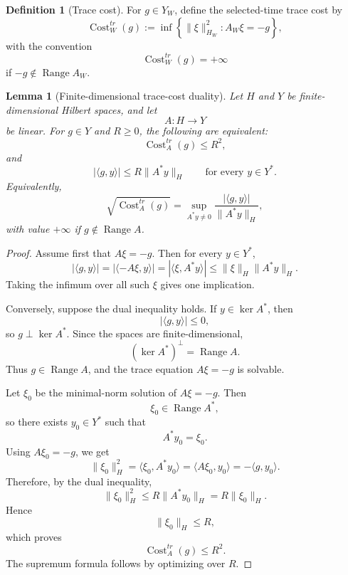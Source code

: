 \documentclass[11pt]{article}
\numberwithin{equation}{section}
\theoremstyle{plain}
\newtheorem{lemma}[theorem]{Lemma}
\theoremstyle{definition}
\newtheorem{definition}[theorem]{Definition}
\theoremstyle{remark}
\begin{document}
\begin{definition}[Trace cost]
\label{def:trace-cost}
For \(g\in Y_W\), define the selected-time trace cost by
\[
        \operatorname{Cost}^{tr}_W(g)
        :=
        \inf
        \left\{
            \|\xi\|_{H_W}^2:
            A_W\xi=-g
        \right\},
\]
with the convention
\[
        \operatorname{Cost}^{tr}_W(g)=+\infty
\]
if \(-g\notin \operatorname{Range}A_W\).
\end{definition}

\begin{lemma}[Finite-dimensional trace-cost duality]
\label{lem:trace-cost-duality-clean}
Let \(H\) and \(Y\) be finite-dimensional Hilbert spaces, and let
\[
        A:H\to Y
\]
be linear.  For \(g\in Y\) and \(R\ge0\), the following are equivalent:
\[
        \operatorname{Cost}^{tr}_A(g)\le R^2,
\]
and
\[
        |\langle g,y\rangle|
        \le
        R\|A^*y\|_H
        \qquad
        \text{for every }y\in Y^*.
\]
Equivalently,
\[
        \sqrt{\operatorname{Cost}^{tr}_A(g)}
        =
        \sup_{A^*y\ne0}
        \frac{|\langle g,y\rangle|}
             {\|A^*y\|_H},
\]
with value \(+\infty\) if \(g\notin \operatorname{Range}A\).
\end{lemma}

\begin{proof}
Assume first that \(A\xi=-g\).  Then for every \(y\in Y^*\),
\[
        |\langle g,y\rangle|
        =
        |\langle -A\xi,y\rangle|
        =
        |\langle \xi,A^*y\rangle|
        \le
        \|\xi\|_H\|A^*y\|_H.
\]
Taking the infimum over all such \(\xi\) gives one implication.

Conversely, suppose the dual inequality holds.  If \(y\in\ker A^*\), then
\[
        |\langle g,y\rangle|\le0,
\]
so \(g\perp \ker A^*\).  Since the spaces are finite-dimensional,
\[
        (\ker A^*)^\perp=\operatorname{Range}A.
\]
Thus \(g\in\operatorname{Range}A\), and the trace equation \(A\xi=-g\) is
solvable.

Let \(\xi_0\) be the minimal-norm solution of \(A\xi=-g\).  Then
\[
        \xi_0\in \operatorname{Range}A^*,
\]
so there exists \(y_0\in Y^*\) such that
\[
        A^*y_0=\xi_0.
\]
Using \(A\xi_0=-g\), we get
\[
        \|\xi_0\|_H^2
        =
        \langle \xi_0,A^*y_0\rangle
        =
        \langle A\xi_0,y_0\rangle
        =
        -\langle g,y_0\rangle.
\]
Therefore, by the dual inequality,
\[
        \|\xi_0\|_H^2
        \le
        R\|A^*y_0\|_H
        =
        R\|\xi_0\|_H.
\]
Hence
\[
        \|\xi_0\|_H\le R,
\]
which proves
\[
        \operatorname{Cost}^{tr}_A(g)\le R^2.
\]
The supremum formula follows by optimizing over \(R\).
\end{proof}
\end{document}
